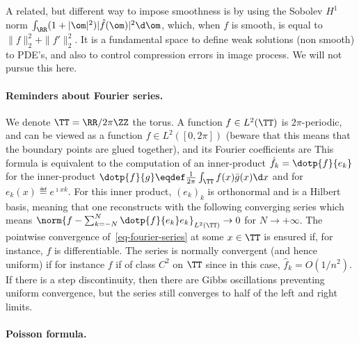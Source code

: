 A related, but different way to impose smoothness is by using the Sobolev $H^1$ norm $\int_\RR (1+|\om|^2) |\hat f(\om)|^2 \d \om$, which, when $f$ is smooth, is equal to $\|f\|_2^2 + \|f'\|_2^2$. It is a fundamental space to define weak solutions (non smooth) to PDE's, and also to control compression errors in image process. We will not pursue this here.

\paragraph{Reminders about Fourier series.}

We denote $\TT=\RR/2\pi\ZZ$ the torus.
%
A function $f \in L^2(\TT)$ is $2\pi$-periodic, and can be viewed as a function $f \in L^2([0,2\pi])$ (beware that this means that the boundary points are glued together), and its Fourier coefficients are
This formula is equivalent to the computation of an inner-product $\hat f_k = \dotp{f}{e_k}$ for the inner-product $\dotp{f}{g} \eqdef \frac{1}{2\pi} \int_\TT f(x) \bar g(x) \d x$ and for $e_k(x) \eqdef e^{\imath x k}$. 
%
For this inner product, $(e_k)_k$ is orthonormal and is a Hilbert basis, meaning that one reconstructs with the following converging series 
which means $\norm{f-\sum_{k=-N}^N \dotp{f}{e_k} e_k}_{L^2(\TT)} \rightarrow 0$ for $N \rightarrow +\infty$.
%
The pointwise convergence of~\eqref{eq-fourier-series} at some $x \in \TT$ is ensured if, for instance, $f$ is differentiable. The series is normally convergent (and hence uniform) if for instance $f$ if of class $C^2$ on $\TT$ since in this case, $\hat f_k = O(1/n^2)$. 
%
If there is a step discontinuity, then there are Gibbs oscillations preventing uniform convergence, but the series still converges to half of the left and right limits.


\paragraph{Poisson formula.}


